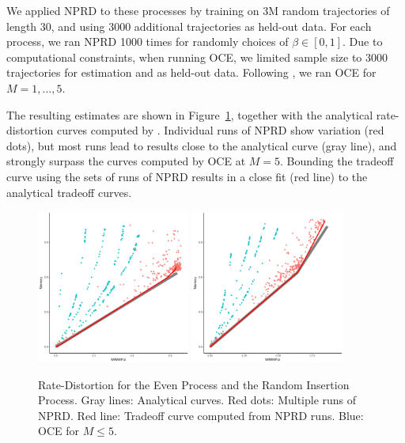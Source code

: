 \documentclass[11pt,letterpaper]{article}
\begin{document}
We applied NPRD to these processes by training on 3M random trajectories of length 30, and using 3000 additional trajectories as held-out data.
For each process, we ran NPRD 1000 times for randomly choices of $\beta \in [0,1]$.
Due to computational constraints, when running OCE, we limited sample size to 3000 trajectories for estimation and as held-out data.
Following \cite{marzen-predictive-2016}, we ran OCE for $M=1,...,5$.

The resulting estimates are shown in Figure~\ref{fig:even}, together with the analytical rate-distortion curves computed by \cite{marzen-predictive-2016}.
Individual runs of NPRD show variation (red dots), but most runs lead to results close to the analytical curve (gray line), and strongly surpass the curves computed by OCE at $M=5$.
Bounding the tradeoff curve using the sets of runs of NPRD results in a close fit (red line) to the analytical tradeoff curves.

\begin{figure}
\includegraphics[width=0.45\textwidth]{cryptfig/even-info.pdf}
\includegraphics[width=0.45\textwidth]{cryptfig/rip-info.pdf}

	\caption{Rate-Distortion for the Even Process and the Random Insertion Process. Gray lines: Analytical curves. Red dots: Multiple runs of NPRD. Red line: Tradeoff curve computed from NPRD runs. Blue: OCE for $M\leq 5$. }\label{fig:even}
\end{figure}
\end{document}

